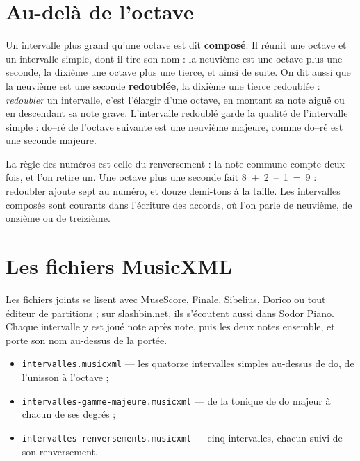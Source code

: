 \documentclass[a4paper,11pt]{article}
\begin{document}
\section{Au-delà de l'octave}
\label{sec:composes}

Un intervalle plus grand qu'une octave est dit \textbf{composé}. Il réunit une
octave et un intervalle simple, dont il tire son nom : la neuvième
est une octave plus une seconde, la dixième une octave plus une tierce, et
ainsi de suite. On dit aussi que la neuvième est une seconde
\textbf{redoublée}, la dixième une tierce redoublée : \emph{redoubler} un
intervalle, c'est l'élargir d'une octave, en montant sa note aiguë ou en
descendant sa note grave. L'intervalle redoublé garde la qualité de
l'intervalle simple : do--ré de l'octave suivante est une neuvième majeure,
comme do--ré est une seconde majeure.

La règle des numéros est celle du renversement : la note commune compte deux
fois, et l'on retire un. Une octave plus une seconde fait 8~+~2~--~1~=~9 :
redoubler ajoute sept au numéro, et douze demi-tons à la taille.
Les intervalles composés sont courants dans l'écriture des accords, où l'on
parle de neuvième, de onzième ou de treizième.

\section{Les fichiers MusicXML}
\label{sec:musicxml}

Les fichiers joints se lisent avec MuseScore, Finale, Sibelius, Dorico ou tout
éditeur de partitions ; sur slashbin.net, ils s'écoutent aussi dans Sodor
Piano. Chaque intervalle y est joué note après note, puis les deux notes
ensemble, et porte son nom au-dessus de la portée.

\begin{itemize}
  \item \texttt{intervalles.musicxml} — les quatorze intervalles simples
    au-dessus de do, de l'unisson à l'octave ;
  \item \texttt{intervalles-gamme-majeure.musicxml} — de la tonique de do
    majeur à chacun de ses degrés ;
  \item \texttt{intervalles-renversements.musicxml} — cinq intervalles, chacun
    suivi de son renversement.
\end{itemize}
\end{document}
